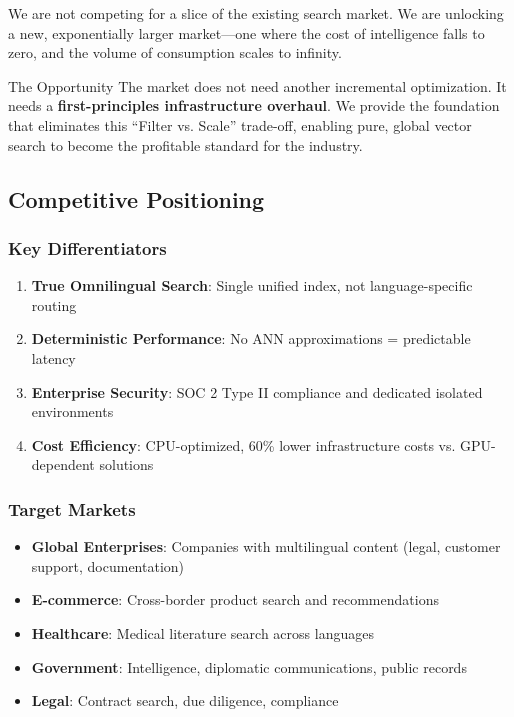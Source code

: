 We are not competing for a slice of the existing search market. We are unlocking a new, exponentially larger market—one where the cost of intelligence falls to zero, and the volume of consumption scales to infinity.

\begin{cosmabox}[cosmaBlue]{The Opportunity}
The market does not need another incremental optimization. It needs a \textbf{first-principles infrastructure overhaul}. We provide the foundation that eliminates this ``Filter vs. Scale'' trade-off, enabling pure, global vector search to become the profitable standard for the industry.
\end{cosmabox}

\subsection{Competitive Positioning}

\subsubsection{Key Differentiators}

\begin{enumerate}
    \item \textbf{True Omnilingual Search}: Single unified index, not language-specific routing
    \item \textbf{Deterministic Performance}: No ANN approximations = predictable latency
    \item \textbf{Enterprise Security}: SOC 2 Type II compliance and dedicated isolated environments
    \item \textbf{Cost Efficiency}: CPU-optimized, 60\% lower infrastructure costs vs. GPU-dependent solutions
\end{enumerate}

\subsubsection{Target Markets}

\begin{itemize}[noitemsep]
    \item \textbf{Global Enterprises}: Companies with multilingual content (legal, customer support, documentation)
    \item \textbf{E-commerce}: Cross-border product search and recommendations
    \item \textbf{Healthcare}: Medical literature search across languages
    \item \textbf{Government}: Intelligence, diplomatic communications, public records
    \item \textbf{Legal}: Contract search, due diligence, compliance
\end{itemize}

